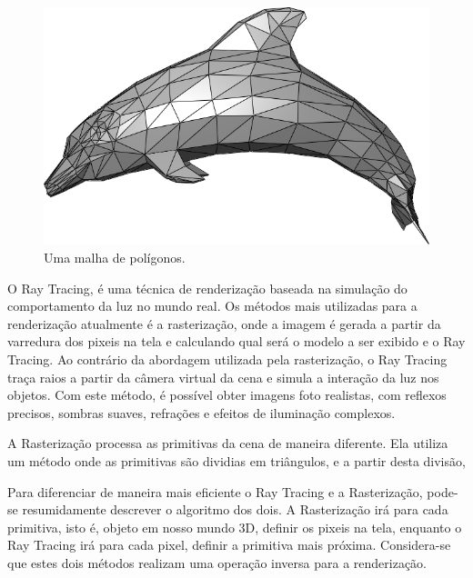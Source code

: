 \documentclass[journal]{IEEEtran}
\begin{document}
\begin{figure}[!t]
\centering
\includegraphics[width=\linewidth]{media/mesh.png}
\caption{Uma malha de polígonos.}
\label{fig_sim}
\end{figure}

O Ray Tracing, é uma técnica de renderização baseada na simulação do comportamento
da luz no mundo real. Os métodos mais utilizadas para a renderização atualmente
é a rasterização, onde a imagem é gerada a partir da varredura dos pixeis na
tela e calculando qual será o modelo a ser exibido e o Ray Tracing. Ao contrário da
abordagem utilizada pela rasterização, o Ray Tracing traça raios a partir da
câmera virtual da cena e simula a interação da luz nos objetos. Com este método,
é possível obter imagens foto realistas, com reflexos precisos, sombras suaves,
refrações e efeitos de iluminação complexos. 

A Rasterização processa as primitivas da cena de maneira diferente. Ela
utiliza um método onde as primitivas são dividias em triângulos, e a partir desta
divisão, 

Para diferenciar de maneira mais eficiente o Ray Tracing e a Rasterização, pode-se
resumidamente descrever o algoritmo dos dois. A Rasterização irá  para cada
primitiva, isto é, objeto em nosso mundo 3D, definir os pixeis na tela, enquanto
o Ray Tracing irá para cada pixel, definir a primitiva mais próxima. Considera-se
que estes dois métodos realizam uma operação inversa para a renderização.
\cite{c11}
\end{document}
